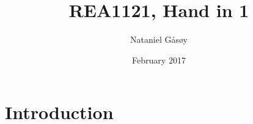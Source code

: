 \documentclass{article}
\title{REA1121, Hand in 1}
\author{Nataniel Gåsøy }
\date{February 2017}
\begin{document}
\maketitle

\section{Introduction}
\end{document}
